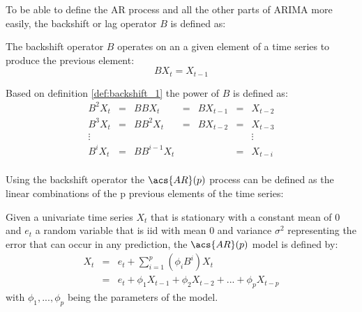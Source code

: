 To be able to define the \acs{AR} process and all the other parts of \acs{ARIMA} more easily, the backshift or lag operator $B$ is defined as:

\begin{definition}\label{def:backshift_1}
    The backshift operator $B$ operates on an a given element of a time series to produce the previous element:\textsuperscript{\cite[p.~29]{Brockwell2002Introduction2nd}}
    \begin{equation}\label{eq:backshift_1}
        B X_t = X_{t-1}
    \end{equation}
\end{definition}

\begin{definition}\label{def:backshift_i}
    Based on definition \ref{def:backshift_1} the power of $B$ is defined as:
    \begin{equation}\label{eq:backshit_i}
        \begin{array}{lclclcl}
            B^2 X_t &=& B B X_t &=& B X_{t-1} &=& X_{t-2} \\
            B^3 X_t &=& B B^2 X_t &=& B X_{t-2} &=& X_{t-3} \\
            \vdots &&&&&&\vdots \\
            B^i X_t &=& B B^{i-1} X_t && &=& X_{t-i} \\
        \end{array}
    \end{equation}
\end{definition}

Using the backshift operator the $\acs{AR}(p)$ process can be defined as the linear combinations of the p previous elements of the time series:

\begin{definition}\label{def:autoregression}
    Given a univariate time series \(X_t\) that is stationary with a constant mean of 0 and \(e_t\) a random variable that is \acl{iid} with mean 0 and variance $\sigma^2$ representing the error that can occur in any prediction, the $\acs{AR}(p)$ model is defined by:\textsuperscript{\cite[p.~17]{Brockwell2002Introduction2nd}}
    \begin{equation}\label{eq:AR_p}
        \begin{array}{lcl}
            X_t &=& e_t + \displaystyle\sum_{i=1}^{p} (\phi_i B^i) X_t \\
            &=& e_t + \phi_1 X_{t-1}+ \phi_2 X_{t-2}+ ... + \phi_p X_{t-p}
        \end{array}
    \end{equation}
    with $\phi_1, ..., \phi_p$ being the parameters of the model.
\end{definition}

